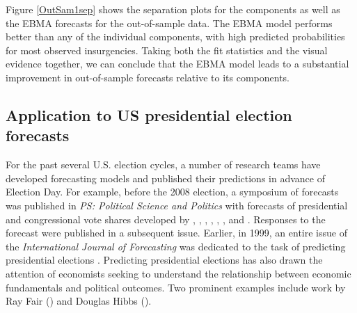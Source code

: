 \documentclass[pdftex,12pt,fullpage,oneside]{amsart}
\begin{document}

Figure \ref{OutSam1sep} shows the separation plots for the components
as well as the EBMA forecasts for the out-of-sample data.  The EBMA
model performs better than any of the individual components, with high
predicted probabilities for most observed insurgencies.  Taking
both the fit statistics and the visual evidence together, we can
conclude that the EBMA model leads to a substantial improvement in
out-of-sample forecasts relative to its components.




\subsection{Application to US presidential election forecasts}
For the past several U.S. election cycles, a number of research teams
have developed forecasting models and published their predictions in
advance of Election Day.  For example, before the 2008 election, a
symposium of forecasts was published in \emph{PS: Political Science
  and Politics} with forecasts of presidential and congressional vote
shares developed by \citet{Campbell:2008}, \citet{Norpoth:2008},
\citet{Lewis-Beck:Tien:2008}, \citet{Abramowitz:2008},
\citet{Erikson:Wlezien:2008}, \citet{Holbrook:2008},
\citet{Lockerbie:2008} and \citet{Cuzan:Bundrick:2008}.  Responses to
the forecast were published in a subsequent issue. Earlier, in 1999,
an entire issue of the \textit{International Journal of Forecasting}
was dedicated to the task of predicting presidential elections
\citep{Brown:1999}.  Predicting presidential elections has also drawn
the attention of economists seeking to understand the relationship
between economic fundamentals and political outcomes.  Two prominent
examples include work by Ray Fair (\citeyear{Fair:2010}) and Douglas
Hibbs (\citeyear{Hibbs:2000}).
\end{document}

